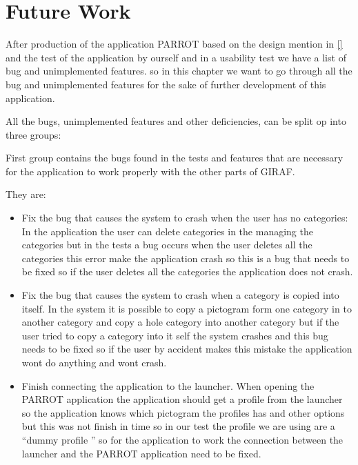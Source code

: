 \chapter{Future Work}

After production of the application PARROT based on the design mention in \autoref{} and the test of the application by ourself and in a usability test we have a list of bug and unimplemented features. so in this chapter we want to go through all the bug and unimplemented features for the sake of further development of this application.

All the bugs, unimplemented features and other deficiencies, can be split op into three groups:

First group contains the bugs found in the tests and features that are necessary for the application to work properly with the other parts of GIRAF.\newline 

They are:

\begin{itemize}
	\item Fix the bug that causes the system to crash when the user has no categories: In the application the user can delete categories in the managing the categories but in 			  		the tests a bug occurs when the user deletes all the categories this error make the application crash so this is a bug that needs to be fixed so if the user deletes 		        all the categories the application does not crash.
	
	\item Fix the bug that causes the system to crash when a category is copied into itself. In the system it is possible to copy a pictogram form one category in to another 				 		category and copy a hole category into another category but if the user tried to copy a category into it self the system crashes and this bug needs to be fixed so if           the user by accident makes this mistake the application wont do anything and wont crash. 
	
	\item Finish connecting the application to the launcher. When opening the PARROT application the application should get a profile from the launcher so the application knows 					which pictogram the profiles has and other options but this was not finish in time so in our test the profile we are using are a ``dummy profile '' so for the 									application to work the connection between the launcher and the PARROT application need to be fixed.  
\end{itemize}
  
